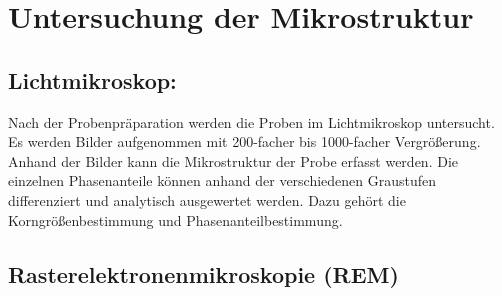 \section{Untersuchung der Mikrostruktur}

\subsection{Lichtmikroskop:}
Nach der Probenpräparation werden die Proben im Lichtmikroskop untersucht. Es werden Bilder aufgenommen mit 200-facher bis 1000-facher Vergrößerung. Anhand der Bilder kann die Mikrostruktur der Probe erfasst werden. Die einzelnen Phasenanteile können anhand der verschiedenen Graustufen differenziert und analytisch ausgewertet werden. Dazu gehört die Korngrößenbestimmung und Phasenanteilbestimmung. 


\subsection{Rasterelektronenmikroskopie (REM)}


